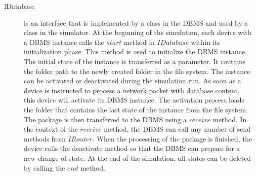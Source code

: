 \documentclass[english,version-2019-11]{uzl-thesis}
\begin{document}
\begin{description}
\item [IDatabase]
is an interface that is implemented by a class in the DBMS and used by a class in the simulator. At the beginning of the simulation, each device with a DBMS instance calls the $start$ method in $IDatabase$ within its initialization phase. This method is used to initialize the DBMS instance. The initial state of the instance is transferred as a parameter. It contains the folder path to the newly created folder in the file system. The instance can be activated or deactivated during the simulation run. As soon as a device is instructed to process a network packet with database content, this device will activate its DBMS instance. The activation process loads the folder that contains the last state of the instance from the file system. The package is then transferred to the DBMS using a $receive$ method. In the context of the $receive$ method, the DBMS can call any number of send methods from $IRouter$. When the processing of the package is finished, the device calls the deactivate method so that the DBMS can prepare for a new change of state. At the end of the simulation, all states can be deleted by calling the $end$ method.
\end{description}
\end{document}
